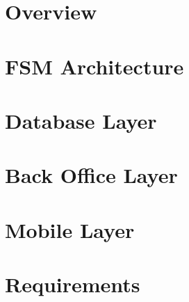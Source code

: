 
\newcommand*{\archi}{chapters/architecture/}

\section{Overview}
	
\section{FSM Architecture}
	
\section{Database Layer}
	
\section{Back Office Layer}
	
	
\section{Mobile Layer}
	
\section{Requirements}
	
